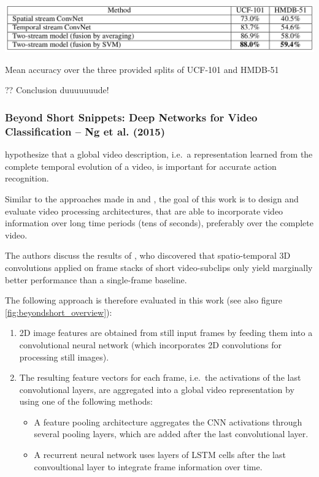 \begin{table}[H]
    \centering
    \includegraphics[width=\textwidth]{img_deep/twostream_results}
    \caption{Mean accuracy over the three provided splits of UCF-101 and HMDB-51 \cite{simonyan_two-stream_2014}}
    \label{tab:twostream_results}
\end{table}

?? Conclusion duuuuuuude!

\subsubsection{Beyond Short Snippets: Deep Networks for Video Classification -- Ng et al. (2015)}

\textcite{ng_beyond_2015} hypothesize that a global video description, i.e.\ a representation learned from the complete temporal evolution of a video, is important for accurate action recognition.

Similar to the approaches made in \cite{baccouche_sequential_2011} and \cite{varol_long-term_2016}, the goal of this work is to design and evaluate video processing architectures, that are able to incorporate video information over long time periods (tens of seconds), preferably over the complete video.

The authors discuss the results of \textcite{karpathy_large-scale_2014}, who discovered that spatio-temporal 3D convolutions applied on frame stacks of short video-subclips only yield marginally better performance than a single-frame baseline.

The following approach is therefore evaluated in this work (see also figure \ref{fig:beyondshort_overview}):
\begin{enumerate}
    \item 2D image features are obtained from still input frames by feeding them into a convolutional neural network (which incorporates 2D convolutions for processing still images).
    \item The resulting feature vectors for each frame, i.e.\ the activations of the last convolutional layers, are aggregated into a global video representation by using one of the following methods:
    \begin{itemize}
        \item A feature pooling architecture aggregates the CNN activations through several pooling layers, which are added after the last convolutional layer.
        \item A recurrent neural network uses layers of LSTM cells after the last convoultional layer to integrate frame information over time.
    \end{itemize}
\end{enumerate}

